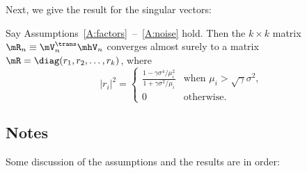 Next, we give the result for the singular vectors:
\begin{theorem}\label{T:vectors}
    Say Assumptions~\ref{A:factors}~--~\ref{A:noise} hold.  Then the
    $k\times k$ matrix $\mR_n \equiv \mV_n^\trans \mhV_n$ converges almost 
    surely to a matrix $\mR = \diag(r_1, r_2, \ldots, r_k)$, where
    \begin{equation}
        |r_i|^2
        =
        \begin{cases}
            \frac{ 1 - \gamma \sigma^4 / \mu_i^2 }
                 { 1 + \gamma \sigma^2 / \mu_i  }
            &\text{when $\mu_i > \sqrt{\gamma} \sigma^2$,} \\
            0
            &\text{otherwise.}
        \end{cases}
    \end{equation}
\end{theorem}


\subsection{Notes}

Some discussion of the assumptions and the results are in order:


